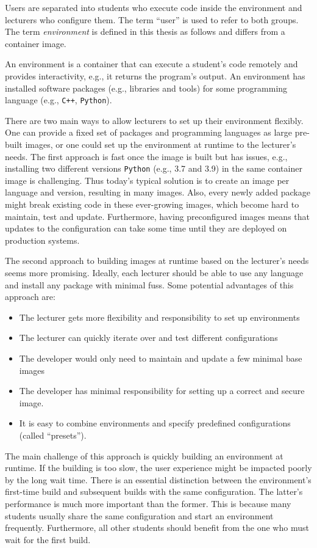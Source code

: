 Users are separated into students who execute code inside the environment and lecturers who configure them. The term ``user'' is used to refer to both groups. The term \emph{environment} is defined in this thesis as follows and differs from a container image.
\begin{Def}
  \label{def:environment}
  An environment is a container that can execute a student's code remotely and provides interactivity, e.g., it returns the program's output. An environment has installed software packages (e.g., libraries and tools) for some programming language (e.g., \verb|C++|, \verb|Python|).
\end{Def}

There are two main ways to allow lecturers to set up their environment flexibly. One can provide a fixed set of packages and programming languages as large pre-built images, or one could set up the environment at runtime to the lecturer's needs. The first approach is fast once the image is built but has issues, e.g., installing two different versions \verb|Python| (e.g., 3.7 and 3.9) in the same container image is challenging. Thus today's typical solution is to create an image per language and version, resulting in many images. Also, every newly added package might break existing code in these ever-growing images, which become hard to maintain, test and update. Furthermore, having preconfigured images means that updates to the configuration can take some time until they are deployed on production systems. 

The second approach to building images at runtime based on the lecturer's needs seems more promising. Ideally, each lecturer should be able to use any language and install any package with minimal fuss. Some potential advantages of this approach are:
\begin{itemize}
  \item The lecturer gets more flexibility and responsibility to set up environments
  \item The lecturer can quickly iterate over and test different configurations
  \item The developer would only need to maintain and update a few minimal base images
  \item The developer has minimal responsibility for setting up a correct and secure image.
  \item It is easy to combine environments and specify predefined configurations (called ``presets'').
\end{itemize}
The main challenge of this approach is quickly building an environment at runtime. If the building is too slow, the user experience might be impacted poorly by the long wait time. There is an essential distinction between the environment's first-time build and subsequent builds with the same configuration. The latter's performance is much more important than the former. This is because many students usually share the same configuration and start an environment frequently. Furthermore, all other students should benefit from the one who must wait for the first build.

